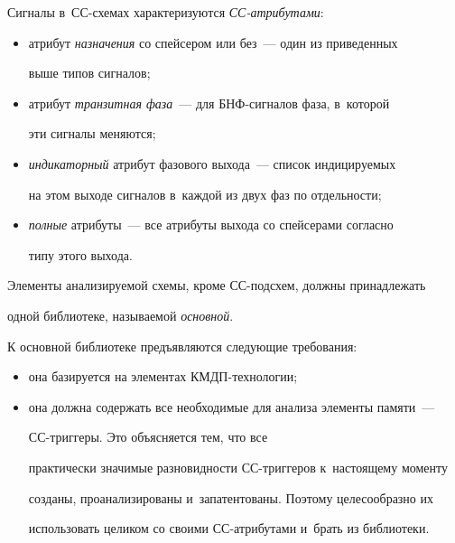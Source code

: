 

   


   Сигналы в~СС-схемах характеризуются \textit{СС-атрибутами}:


   


   \begin{itemize}


   \item 


   атрибут \textit{назначения} со спейсером или без~--- один из приведенных 


выше типов сигналов;


   \item 


      атрибут \textit{транзитная фаза}~--- для БНФ-сигналов фаза, в~которой 


эти сигналы меняются;


   \item 


   \textit{индикаторный} атрибут фазового выхода~--- список индицируемых 


на этом выходе сигналов в~каждой из двух фаз по отдельности;


   \item 


   \textit{полные} атрибуты~--- все атрибуты выхода со спейсерами согласно 


типу этого выхода.


\end{itemize}







   


   Элементы анализируемой схемы, кроме СС-подсхем, должны принадлежать 


одной библиотеке, называемой \textit{основной}.


   


   К основной библиотеке предъявляются следующие требования:


   \begin{itemize}


   \item она базируется на элементах КМДП-технологии;


   \item 


   она должна содержать все необходимые для анализа элементы памяти~--- 


СС-триг\-ге\-ры. Это объясняется тем, что все 


практически значимые разновидности СС-триг\-ге\-ров к~настоящему моменту 


созданы, проанализированы и~запатентованы. Поэтому целесообразно их 


использовать целиком со своими СС-ат\-ри\-бу\-та\-ми и~брать из библиотеки.


\end{itemize}





